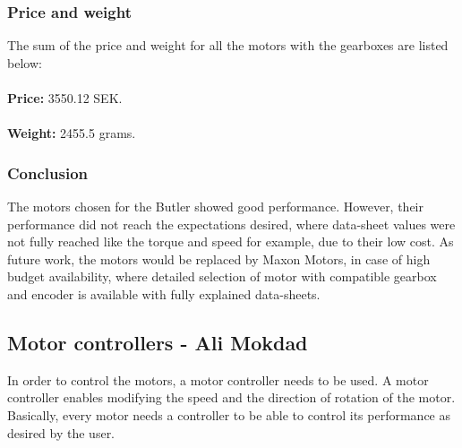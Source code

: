 
\subsubsection{Price and weight}
The sum of the price and weight for all the motors with the gearboxes are listed below:\\\\
\textbf{Price:} 3550.12 SEK.\\\\
\textbf{Weight:} 2455.5 grams. 

\subsubsection{Conclusion}
The motors chosen for the Butler showed good performance. However, their performance did not reach the expectations desired, where data-sheet values were not fully reached like the torque and speed for example, due to their low cost.
As future work, the motors would be replaced by Maxon Motors, in case of high budget availability, where detailed selection of motor with compatible gearbox and encoder is available with fully explained data-sheets.

\subsection{Motor controllers - Ali Mokdad}
\label{MotorController}%
In order to control the motors, a motor controller needs to be used. A motor controller enables modifying the speed and the direction of rotation of the motor. Basically, every motor needs a controller to be able to control its performance as desired by the user.


